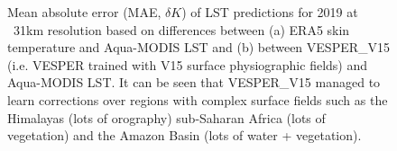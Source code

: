 \documentclass[hess, twostagejnl]{copernicus}
\providecommand{\DIFadd}[1]{{\protect\color{blue} \sf #1}} %
\providecommand{\DIFaddbegin}{} %
\providecommand{\DIFaddFL}[1]{\DIFadd{#1}} %
\begin{document}
 
 
 \DIFaddbegin \begin{figure}
 	 \DIFaddFL{\hspace{1mm}
 	}
 	\caption{\DIFaddFL{Mean absolute error (MAE, $\delta K$) of LST predictions for 2019 at ~31km resolution based on differences between (a) ERA5 skin temperature and Aqua-MODIS LST and  (b) between VESPER\_V15 (i.e. VESPER trained with V15 surface physiographic fields) and Aqua-MODIS LST. It can be seen that VESPER\_V15 managed to learn corrections over regions with complex surface fields such as the Himalayas (lots of orography) sub-Saharan Africa (lots of vegetation) and the Amazon Basin (lots of water + vegetation). }} 
 	\label{fig:example_model}
 \end{figure}
\end{document}
